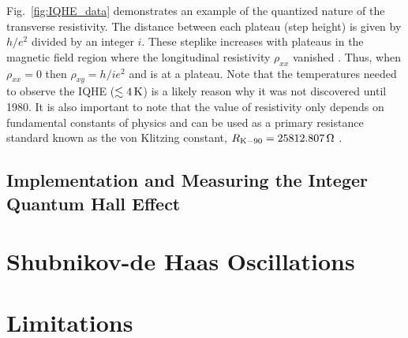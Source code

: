 Fig.~\ref{fig:IQHE_data} demonstrates an example of the quantized nature of the transverse resistivity. The distance between each plateau (step height) is given by $h/e^2$ divided by an integer $i$. These steplike increases with plateaus in the magnetic field region where the longitudinal resistivity $\rho_{xx}$ vanished \cite{Klitzing_RevModPhys1986}. Thus, when $\rho_{xx} = 0$ then $\rho_{xy} = h/i e^2$ and is at a plateau. Note that the temperatures needed to observe the \acs{IQHE} ($\lesssim 4\,\mathrm{K}$) is a likely reason why it was not discovered until 1980. It is also important to note that the value of resistivity only depends on fundamental constants of physics and can be used as a primary resistance standard known as the von Klitzing constant, $R_{\mathrm{K}-90} = 25812.807\,\mathrm{\Omega}$ \cite{Klitzing_PhysRevLett1980,Aoki_PhysRevLett1986,Bliek_Met1988}.

\subsection{Implementation and Measuring the Integer Quantum Hall Effect}\label{subsec:IQHE_measure}

\section{Shubnikov-de Haas Oscillations}\label{sec:sdh_oscillations}

\section{Limitations}\label{sec:limitations}